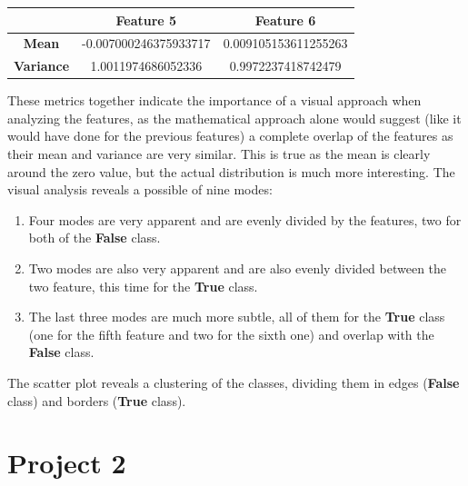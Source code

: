 \documentclass[a4paper, 12pt, english]{article}
\begin{document}
    \begin{table}[htbp]
        \centering
        \begin{tabular}{|c|c|c|}
            \hline
            & \textbf{Feature 5}    & \textbf{Feature 6}   \\
            \hline
            \textbf{Mean}     & -0.007000246375933717 & 0.009105153611255263 \\
            \hline
            \textbf{Variance} & 1.0011974686052336    & 0.9972237418742479   \\
            \hline
        \end{tabular}
    \end{table}

    These metrics together indicate the importance of a visual approach when analyzing the features, as the mathematical approach alone would suggest (like it would have done for the previous features) a complete overlap of the features as their mean and variance are very similar.
    This is true as the mean is clearly around the zero value, but the actual distribution is much more interesting.
    The visual analysis reveals a possible of nine modes:
    \begin{enumerate}
        \item Four modes are very apparent and are evenly divided by the features, two for both of the \textbf{False} class.
        \item Two modes are also very apparent and are also evenly divided between the two feature, this time for the \textbf{True} class.
        \item The last three modes are much more subtle, all of them for the \textbf{True} class (one for the fifth feature and two for the sixth one) and overlap with the \textbf{False} class.
    \end{enumerate}

    The scatter plot reveals a clustering of the classes, dividing them in edges (\textbf{False} class) and borders (\textbf{True} class).


    \newpage


    \section{Project 2}
\end{document}
